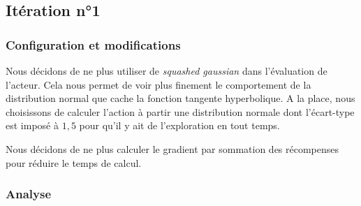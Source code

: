 \subsection{Itération n°1}

\subsubsection{Configuration et modifications}

Nous décidons de ne plus utiliser de \emph{squashed gaussian} dans l'évaluation de l'acteur. Cela nous permet de voir plus finement le comportement de la distribution normal que cache la fonction tangente hyperbolique. A la place, nous choisissons de calculer l'action à partir une distribution normale dont l'écart-type est imposé à $1,5$ pour qu'il y ait de l'exploration en tout temps.

Nous décidons de ne plus calculer le gradient par sommation des récompenses pour réduire le temps de calcul.

\subsubsection{Analyse}


